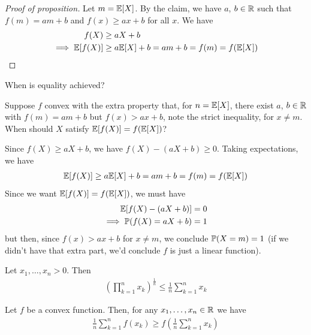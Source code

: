 \documentclass{../template/note}
\begin{document}
    \begin{proof}[Proof of proposition]
        Let \(m = \mathbb E[X]\). By the claim, we have \(a\), \(b \in \mathbb R\) such that \(f(m) = am + b\) and \(f(x) \geq ax + b\) for all \(x\). We have
        \begin{align*}
            f(X) &\geq aX + b \\
            \implies \mathbb E[f(X)] &\geq a\mathbb E[X] + b = am + b = f(m) = f(\mathbb E[X])
        \end{align*}
    \end{proof}
    
    \begin{remark*}
        When is equality achieved?
        
        Suppose \(f\) convex with the extra property that, for \(n = \mathbb E[X]\), there exist \(a\), \(b \in \mathbb R\) with \(f(m) = am + b\) but \(f(x) > ax + b\), note the strict inequality, for \(x \neq m\). When should \(X\) satisfy \(\mathbb E[f(X)] = f(\mathbb E[X])\)?

        Since \(f(X) \geq aX + b\), we have \(f(X) - (aX + b) \geq 0\). Taking expectations, we have
        \begin{align*}
            \mathbb E[f(X)] \geq a\mathbb E[X] + b = am + b = f(m) = f(\mathbb E[X])
        \end{align*}
        Since we want \(\mathbb E[f(X)] = f(\mathbb E[X])\), we must have
        \begin{align*}
            \mathbb E[f(X) - (aX + b)] &= 0 \\
            \implies \mathbb P(f(X) = aX + b) &= 1
        \end{align*}
        but then, since \(f(x) > ax + b\) for \(x \neq m\), we conclude \(\mathbb P(X = m) = 1\) (if we didn't have that extra part, we'd conclude \(f\) is just a linear function).
        
    \end{remark*}


    \begin{proposition}[AM-GM inequality]
        Let \(x_1, \dots, x_n > 0\). Then 
        \begin{align*}
            \left(\prod_{k=1}^n x_k\right)^{\frac 1 n} \leq \frac 1 n \sum_{k=1}^n x_k
        \end{align*}
    \end{proposition}
    
    \begin{lemma}
        Let \(f\) be a convex function. Then, for any \(x_1, \dots, x_n \in \mathbb R\) we have
        \begin{align*}
            \frac 1 n \sum_{k=1}^n f(x_k) \geq f\left(\frac 1 n \sum_{k=1}^n x_k\right)
        \end{align*}
    \end{lemma}
    
\end{document}
